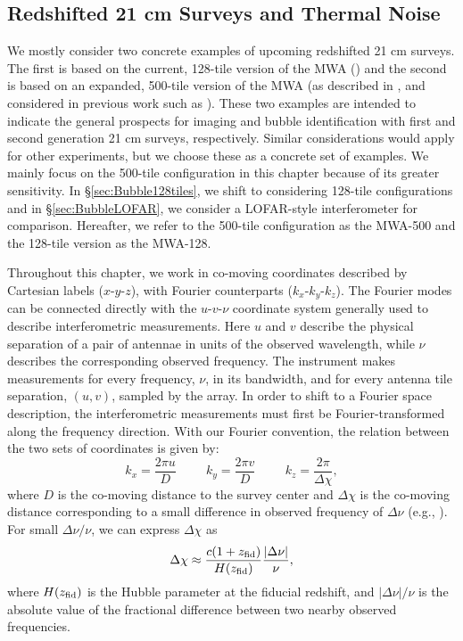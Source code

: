 \subsection{Redshifted 21 cm Surveys and Thermal Noise} \label{sec:Bubblenoise}

We mostly consider two concrete examples of upcoming 
redshifted 21 cm surveys. The first is based on the current, 128-tile version of the
MWA (\citealt{Tingay:2012ps}) and the second is based on an expanded, 500-tile version
of the MWA (as described in
\citealt{Lonsdale:2009cb}, and considered in previous work such as \citealt{McQuinn:2005hk, Lidz:2007az}).
These two examples are intended to indicate the general prospects for imaging and bubble identification with
first and second generation 21 cm surveys, respectively. Similar considerations would apply
for other experiments, but we choose these as a concrete set of examples.
We mainly focus on the 500-tile configuration in this chapter because of its greater sensitivity. In 
\S\ref{sec:Bubble128tiles}, we shift to considering 128-tile configurations
and in \S\ref{sec:BubbleLOFAR}, we consider a LOFAR-style interferometer for comparison. Hereafter, we refer
to the 500-tile configuration as the MWA-500 and the 128-tile version as the MWA-128.

Throughout this chapter, we work in co-moving coordinates described by Cartesian
labels ($x$-$y$-$z$), with Fourier counterparts ($k_x$-$k_y$-$k_z$). The Fourier
modes can be connected directly with the $u$-$v$-$\nu$ coordinate system generally
used to describe interferometric measurements. Here $u$ and
$v$ describe the physical separation of a pair of antennae in units of
the observed wavelength, while $\nu$ describes the corresponding
observed frequency. The instrument makes measurements for every frequency, $\nu$, in
its bandwidth, and for every antenna tile separation, $(u,v)$, sampled by the
array. In order to shift to a
Fourier space description, the interferometric measurements must first be Fourier-transformed
along the frequency direction. 
With our Fourier convention, the relation between the two sets of coordinates
is given by:
\begin{equation}
k_{x} = \frac{2\pi u}{D} \hspace{1cm} k_{y} = \frac{2\pi
  v}{D} \hspace{1cm} k_z = \frac{2\pi}{\Delta \chi}, 
\label{eq:UtoK}\end{equation}
where $D$ is the co-moving distance to the survey center and $\Delta
\chi$ is the co-moving distance corresponding to a small difference in observed
frequency of $\Delta \nu$ (e.g., \citealt{Liu:2009qga}). For small $\Delta \nu/\nu$, we can express $\Delta \chi$ as
\begin{equation}
\Delta \chi \approx \frac{c (1 + z_{\rm fid})}{H(z_{\text{fid}})} \frac{|\Delta
  \nu|}{\nu},
\end{equation}
where $H(z_{\rm fid})$ is the Hubble parameter at the fiducial
redshift, and $|\Delta \nu|/\nu$ is the absolute value of the fractional difference between two nearby observed frequencies.


